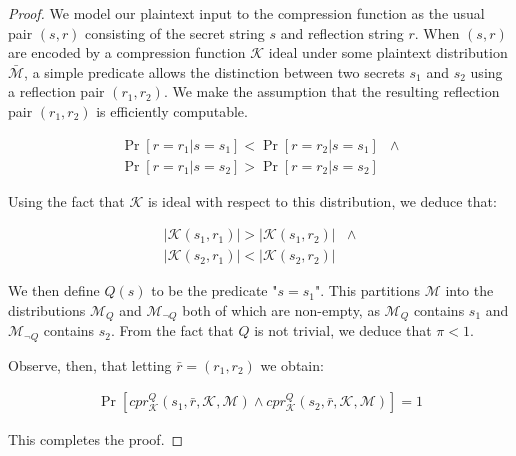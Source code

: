 \begin{proof}
We model our plaintext input to the compression function as the usual pair $(s,
r)$ consisting of the secret string $s$ and reflection string $r$. When $(s, r)$
are encoded by a compression function $\mathcal{K}$ ideal under some plaintext
distribution $\bar{\mathcal{M}}$, a simple predicate allows the distinction
between two secrets $s_1$ and $s_2$ using a reflection pair $(r_1, r_2)$.  We
make the assumption that the resulting reflection pair $(r_1, r_2)$ is
efficiently computable.

\begin{align*}
    \Pr[r = r_1|s = s_1] < \Pr[r = r_2|s = s_1]&\land\\
    \Pr[r = r_1|s = s_2] > \Pr[r = r_2|s = s_2]&
\end{align*}

Using the fact that $\mathcal{K}$ is ideal with respect to this distribution,
we deduce that:

\begin{align*}
    |\mathcal{K}(s_1, r_1)| > |\mathcal{K}(s_1, r_2)|&\land\\
    |\mathcal{K}(s_2, r_1)| < |\mathcal{K}(s_2, r_2)|&
\end{align*}

We then define $Q(s)$ to be the predicate "$s = s_1$". This partitions
$\mathcal{M}$ into the distributions $\mathcal{M}_Q$ and
$\mathcal{M}_{\lnot Q}$ both of which are non-empty, as $\mathcal{M}_Q$
contains $s_1$ and $\mathcal{M}_{\lnot Q}$ contains $s_2$. From the fact that
$Q$ is not trivial, we deduce that $\pi < 1$.

Observe, then, that letting $\bar{r} = (r_1, r_2)$ we obtain:

\begin{align*}
    \Pr[cpr^Q_{\mathcal{K}}(s_1, \bar{r}, \mathcal{K}, \mathcal{M})
    \land
    cpr^Q_{\mathcal{K}}(s_2, \bar{r}, \mathcal{K}, \mathcal{M})] = 1
\end{align*}

This completes the proof.

\end{proof}

\begin{lemma}
\end{lemma}

